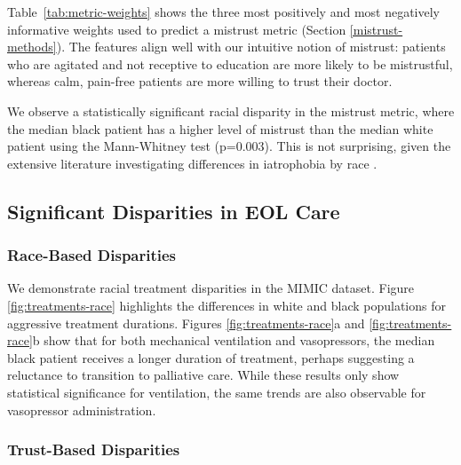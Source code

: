 \documentclass{article}
\newcommand{\squeezeup}{\vspace{-2.5mm}}
\begin{document}
Table~\ref{tab:metric-weights} shows the three most positively and most negatively informative weights used to predict a mistrust metric (Section \ref{mistrust-methods}). The features align well with our intuitive notion of mistrust: patients who are agitated and not receptive to education are more likely to be mistrustful, whereas calm, pain-free patients are more willing to trust their doctor.

We observe a statistically significant racial disparity in the mistrust metric, where the median black patient has a higher level of mistrust than the median white patient using the Mann-Whitney test (p=0.003). This is not surprising, given the extensive literature investigating differences in iatrophobia by race \citep{medicalapartheid}.


\subsection{Significant Disparities in EOL Care}
\label{sec:treatment-stats}

\subsubsection{Race-Based Disparities}

We demonstrate racial treatment disparities in the MIMIC dataset. Figure \ref{fig:treatments-race} highlights the differences in white and black populations for aggressive treatment durations. Figures \ref{fig:treatments-race}a and \ref{fig:treatments-race}b show that for both mechanical ventilation and vasopressors, the median black patient receives a longer duration of treatment, perhaps suggesting a reluctance to transition to palliative care. While these results only show statistical significance for ventilation, the same trends are also observable for vasopressor administration. 

\squeezeup




\subsubsection{Trust-Based Disparities}
\end{document}
